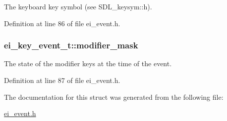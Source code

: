 The keyboard key symbol (see SDL\_\-keysym::h). 

Definition at line 86 of file ei\_\-event.h.\hypertarget{structei__key__event__t_a35e4dc6d788b9fdd4eeedf716662afab}{
\subsubsection[{modifier\_\-mask}]{ {\bf ei\_\-key\_\-event\_\-t::modifier\_\-mask}}}
\label{structei__key__event__t_a35e4dc6d788b9fdd4eeedf716662afab}


The state of the modifier keys at the time of the event. 

Definition at line 87 of file ei\_\-event.h.

The documentation for this struct was generated from the following file:\begin{DoxyCompactItemize}
\item 
\hyperlink{ei__event_8h}{ei\_\-event.h}\end{DoxyCompactItemize}

